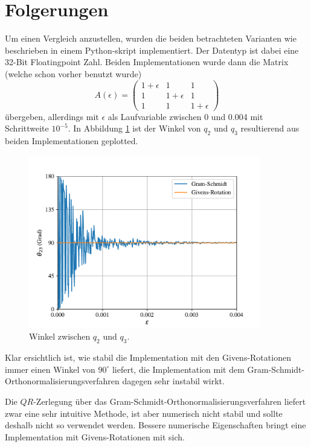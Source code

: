 %
%
%
\section{Folgerungen
\label{qr:section:folgerungen}}
Um einen Vergleich anzustellen, wurden die beiden betrachteten Varianten wie beschrieben in einem Python-skript implementiert. 
Der Datentyp ist dabei eine 32-Bit Floatingpoint Zahl.
Beiden Implementationen wurde dann die Matrix (welche schon vorher benutzt wurde)
\begin{equation*}
	A(\epsilon)=
	\begin{pmatrix}
	1+\epsilon&1&1\\
	1&1+\epsilon&1\\
	1&1&1+\epsilon
	\end{pmatrix}
\end{equation*}
übergeben, allerdings mit $\epsilon$ als Laufvariable zwischen 0 und 0.004 mit Schrittweite $10^{-5}$.
In Abbildung \ref{qr:comp} ist der Winkel von $q_2$ und $q_3$ resultierend aus beiden Implementationen geplotted.
\begin{figure}[ht]
	\centering
	\includegraphics[width=0.9\textwidth]{papers/qr/pics/comp.pdf}
	\caption{Winkel zwischen $q_2$ und $q_3$.\label{qr:comp}}
\end{figure}
Klar ersichtlich ist, wie stabil die Implementation mit den Givens-Rotationen immer einen Winkel von $90^\circ$ liefert, die Implementation mit dem Gram-Schmidt-Orthonormalisierungsverfahren dagegen sehr instabil wirkt.

Die $QR$-Zerlegung über das Gram-Schmidt-Orthonormalisierungsverfahren liefert zwar eine sehr intuitive Methode, ist aber numerisch nicht stabil und sollte deshalb nicht so verwendet werden.
Bessere numerische Eigenschaften bringt eine Implementation mit Givens-Rotationen mit sich.